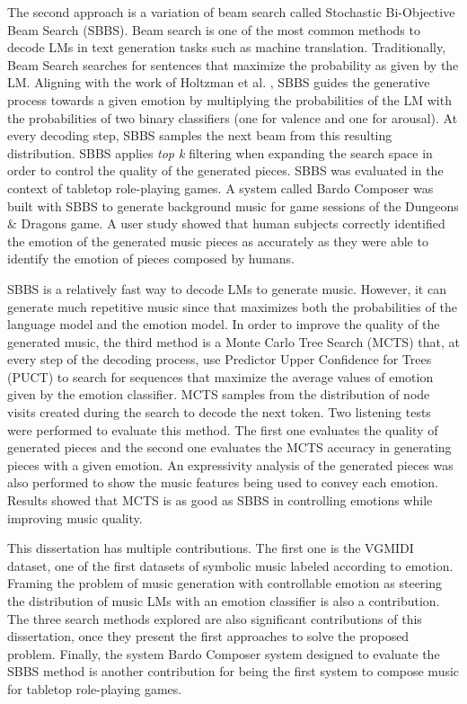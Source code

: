 The second approach is a variation of beam search called Stochastic Bi-Objective Beam Search (SBBS). Beam search is one of the most common methods to decode LMs in text generation tasks such as machine translation. Traditionally, Beam Search searches for sentences that maximize the probability as given by the LM. Aligning with the work of Holtzman et al. \cite{holtzman2018learning}, SBBS guides the generative process towards a given emotion by multiplying the probabilities of the LM with the probabilities of two binary classifiers (one for valence and one for arousal). At every decoding step, SBBS samples the next beam from this resulting distribution. SBBS applies \textit{top k} filtering when expanding the search space in order to control the quality of the generated pieces. SBBS was evaluated in the context of tabletop role-playing games. A system called Bardo Composer was built with SBBS to generate background music for game sessions of the Dungeons \& Dragons game. A user study showed that human subjects correctly identified the emotion of the generated music pieces as accurately as they were able to identify the emotion of pieces composed by humans.

SBBS is a relatively fast way to decode LMs to generate music. However, it can generate much repetitive music since that maximizes both the probabilities of the language model and the emotion model. In order to improve the quality of the generated music, the third method is a Monte Carlo Tree Search (MCTS) that, at every step of the decoding process, use Predictor Upper Confidence for Trees (PUCT) to search for sequences that maximize the average values of emotion given by the emotion classifier. MCTS samples from the distribution of node visits created during the search to decode the next token. Two listening tests were performed to evaluate this method. The first one evaluates the quality of generated pieces and the second one evaluates the MCTS accuracy in generating pieces with a given emotion. An expressivity analysis of the generated pieces was also performed to show the music features being used to convey each emotion. Results showed that MCTS is as good as SBBS  in controlling emotions while improving music quality.

This dissertation has multiple contributions. The first one is the VGMIDI dataset, one of the first datasets of symbolic music labeled according to emotion. Framing the problem of music generation with controllable emotion as steering the distribution of music LMs with an emotion classifier is also a contribution. The three search methods explored are also significant contributions of this dissertation, once they present the first approaches to solve the proposed problem. Finally, the system Bardo Composer system designed to evaluate the SBBS method is another contribution for being the first system to compose music for tabletop role-playing games.

